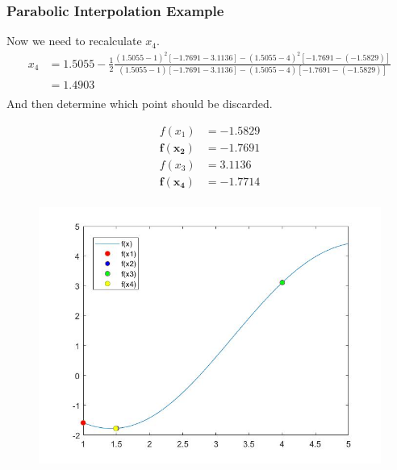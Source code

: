\documentclass{if-beamer}
\begin{document}
\begin{frame}[t]
	\frametitle{Parabolic Interpolation Example}
	Now we need to recalculate $x_4$.
	\begin{align*}
	x_4 &= 1.5055-\frac{1}{2}\frac{(1.5055-1)^2[-1.7691-3.1136]-(1.5055-4)^2[-1.7691-(-1.5829)]}{(1.5055-1)[-1.7691-3.1136]-(1.5055-4)[-1.7691-(-1.5829)]}\\
	&=1.4903\\
\end{align*}	
	And then determine which point should be discarded.\\
	\begin{minipage}{0.5\textwidth}
		\begin{align*}
			f(x_1) &= -1.5829\\
			\mathbf{f(x_2)} &= \mathbf{-1.7691}\\
			f(x_3) &= 3.1136\\
			\mathbf{f(x_4)} &= \mathbf{-1.7714}\\
		\end{align*}
	\end{minipage}
	\begin{minipage}{0.5\textwidth}
		\begin{figure}
			\centering
			\includegraphics[width=\textwidth]{figures/plot4}
		\end{figure}
	\end{minipage}
\end{frame}
\end{document}
